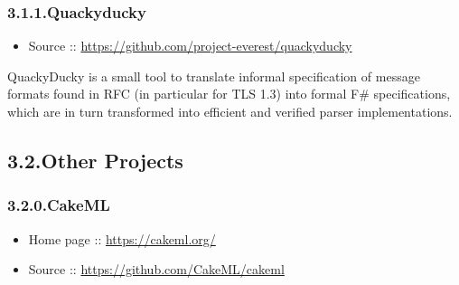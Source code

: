 \documentclass[12pt,twoside]{article}
\begin{document}
\subsubsection{3.1.1.\hspace*{0.5em}Quackyducky}\label{sec-quackyducky}%

\begin{itemize}[noitemsep,topsep=\mdcompacttopsep]%

\item{}Source :: \href{https://github.com/project-everest/quackyducky}{{\ttfamily https://\hspace{0pt}github.\hspace{0pt}com/\hspace{0pt}project-\hspace{0pt}everest/\hspace{0pt}quackyducky}}%
\end{itemize}%

\noindent{}QuackyDucky is a small tool to translate informal specification of
message formats found in RFC (in particular for TLS 1.3) into formal
F\# specifications, which are in turn transformed into efficient and
verified parser implementations.%

\subsection{3.2.\hspace*{0.5em}Other Projects}\label{sec-other-projects}%

\subsubsection{3.2.0.\hspace*{0.5em}CakeML}\label{sec-cakeml}%

\begin{itemize}[noitemsep,topsep=\mdcompacttopsep]%

\item{}Home page :: \href{https://cakeml.org/}{{\ttfamily https://\hspace{0pt}cakeml.\hspace{0pt}org/\hspace{0pt}}}%

\item{}Source :: \href{https://github.com/CakeML/cakeml}{{\ttfamily https://\hspace{0pt}github.\hspace{0pt}com/\hspace{0pt}CakeML/\hspace{0pt}cakeml}}%
\end{itemize}%
\end{document}
